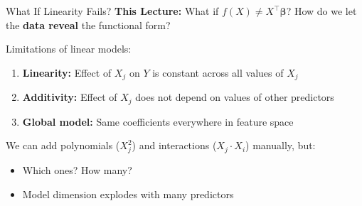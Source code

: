 \documentclass[10pt]{beamer}
\newcommand{\highlight}[1]{\textcolor{AccentOrange}{\textbf{#1}}}
\begin{document}

\begin{frame}{What If Linearity Fails?}
  \textbf{This Lecture:} What if $f(X) \neq X^\top\boldsymbol{\beta}$? How do we let the \highlight{data reveal} the functional form?

  \vspace{1em}
Limitations of linear models:
  \begin{enumerate}
    \item \textbf{Linearity:} Effect of $X_j$ on $Y$ is constant across all values of $X_j$
    \vspace{0.3em}
    \item \textbf{Additivity:} Effect of $X_j$ does not depend on values of other predictors
    \vspace{0.3em}
    \item \textbf{Global model:} Same coefficients everywhere in feature space
  \end{enumerate}

  \vspace{1em}
We can add polynomials ($X_j^2$) and interactions ($X_j\cdot X_i$) manually, but:
  \begin{itemize}
    \item Which ones? How many?
    \item Model dimension explodes with many predictors
  \end{itemize}
\end{frame}

\end{document}
